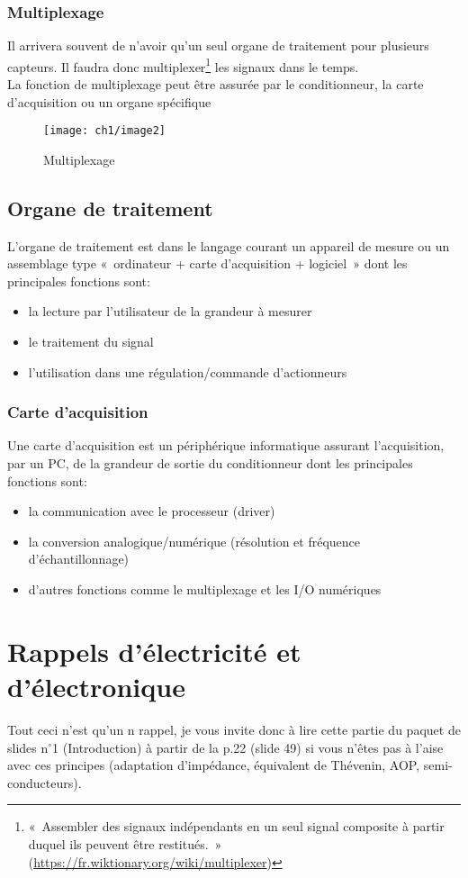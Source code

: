 \subsubsection{Multiplexage}
Il arrivera souvent de n'avoir qu'un seul organe de traitement pour plusieurs capteurs. Il faudra donc multiplexer\footnote{«~Assembler des signaux indépendants en un seul signal composite à partir duquel ils peuvent être restitués.~» (\url{https://fr.wiktionary.org/wiki/multiplexer})} les signaux dans le temps.\\
La fonction de multiplexage peut être assurée par le conditionneur, la carte d'acquisition ou un organe spécifique
\begin{figure}[H] 
	\centering 
	\texttt{[image: ch1/image2]}
	\caption{Multiplexage}
\end{figure}
\subsection{Organe de traitement}
L'organe de traitement est dans le langage courant un appareil de mesure ou un assemblage type «~ordinateur + carte d'acquisition + logiciel~» dont les principales fonctions sont:
\begin{itemize}
	\item la lecture par l'utilisateur de la grandeur à mesurer
	\item le traitement du signal
	\item l'utilisation dans une régulation/commande
	d'actionneurs
\end{itemize}
\subsubsection{Carte d'acquisition}
Une carte d'acquisition est un périphérique informatique assurant l'acquisition, par un PC, de la grandeur de sortie du conditionneur dont les principales fonctions sont:
\begin{itemize}
	\item la communication avec le processeur (driver)
	\item la conversion analogique/numérique (résolution et fréquence d’échantillonnage)
	\item d'autres fonctions comme le multiplexage et les I/O numériques
\end{itemize}
\section{Rappels d'électricité et d'électronique}
Tout ceci n'est qu'un n rappel, je vous invite donc à lire cette partie du paquet de slides n$^\circ$1 (Introduction) à partir de la p.22 (slide 49) si vous n'êtes pas à l'aise avec ces principes (adaptation d'impédance, équivalent de Thévenin, AOP, semi-conducteurs).